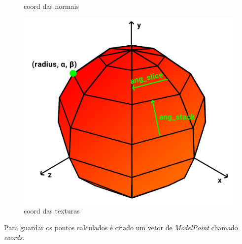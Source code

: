 \documentclass[a4paper]{report}
\begin{document}
\begin{figure}[H]
\begin{minipage}{0.33\textwidth}
        \caption{coord das normais}
    \end{minipage}\hfill
    \begin{minipage}{0.33\textwidth}
        \centering
        \includegraphics[width=\textwidth]{images/sphere_vetores.png}
        \caption{coord das texturas}
    \end{minipage}\hfill
\end{figure}
Para guardar os pontos calculados é criado um vetor de \textit{ModelPoint}
chamado \textit{coords}.


\end{document}
